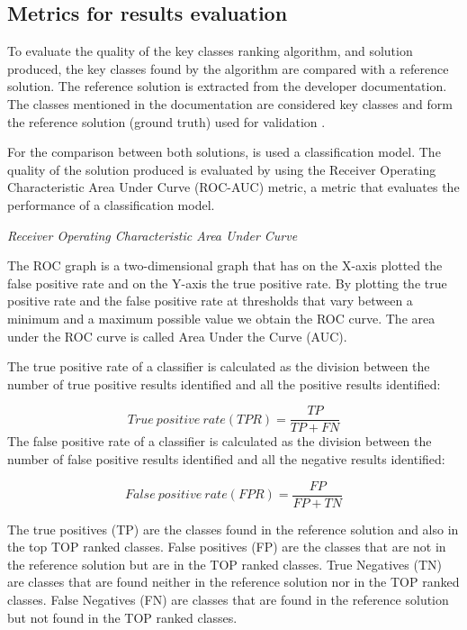 \documentclass[runningheads]{comsis2}
\begin{document}
\subsection{Metrics for results evaluation}
\label{sec:evalmetrics}
To evaluate the quality of the key classes ranking algorithm, and solution produced, the key classes found by the algorithm are compared with a reference solution. The reference solution is extracted from the developer documentation. The classes mentioned in the documentation are considered key classes and form the reference solution (ground truth) used for validation \cite{7551990}.

For the comparison between both solutions,  is used a classification model. The quality of the solution produced is evaluated by using the Receiver Operating Characteristic Area Under Curve (ROC-AUC) metric, a metric that evaluates the performance of a classification model.


\textit{Receiver Operating Characteristic Area Under Curve}


The ROC graph is a two-dimensional graph that has on the X-axis plotted the false positive rate and on the Y-axis the true positive rate. By plotting the true positive rate and the false positive rate at thresholds that vary between a minimum and a maximum possible value we obtain the ROC curve. The area under the ROC curve is called Area Under the Curve (AUC).

The true positive rate of a classifier is calculated as the division between the number of true positive results identified and all the positive results identified:

\begin{equation}
 True\ positive\ rate (TPR) = \frac{TP}{TP+FN}
\end{equation}
The false positive rate of a classifier is calculated as the division between the number of false positive results identified and all the negative results identified:

\begin{equation}
 False\ positive\ rate (FPR) = \frac{FP}{FP+TN}
\end{equation}

The true positives (TP) are the classes found in the reference solution and also in the top TOP ranked classes. False positives (FP) are the classes that are not in the reference solution but are in the TOP ranked classes.
True Negatives (TN) are classes that are found neither in the reference solution nor in the TOP ranked classes. False Negatives (FN) are classes that are found in the reference solution but not found in the TOP ranked classes.
\end{document}
